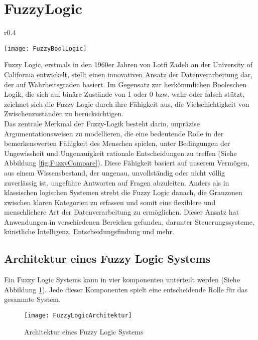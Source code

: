 \section{FuzzyLogic}
\begin{wrapfigure}{r}{0.4\textwidth}
    \vspace{-1.1cm}
    \begin{center}
      \texttt{[image: FuzzyBoolLogic]}
    \end{center}
    \vspace{-0.5cm}
    \caption{Vergleich von Fuzzy Logic zu Boolischer Logik \cite{FuzzyLogicTPoint}}
    \label{fig:FuzzyCompare}
    \vspace{-0.5cm}
  \end{wrapfigure}
Fuzzy Logic, erstmals in den 1960er Jahren von Lotfi Zadeh an der University of California entwickelt, stellt einen innovativen Ansatz der Datenverarbeitung dar, der auf Wahrheitsgraden basiert. Im Gegensatz zur herkömmlichen Booleschen Logik, die sich auf binäre Zustände von 1 oder 0 bzw. wahr oder falsch stützt, zeichnet sich die Fuzzy Logic durch ihre Fähigkeit aus, die Vielschichtigkeit von Zwischenzuständen zu berücksichtigen.\cite{FuzzyLogicTechTarget}\\
Das zentrale Merkmal der Fuzzy-Logik besteht darin, unpräzise Argumentationsweisen zu modellieren, die eine bedeutende Rolle in der bemerkenswerten Fähigkeit des Menschen spielen, unter Bedingungen der Ungewissheit und Ungenauigkeit rationale Entscheidungen zu treffen (Siehe Abbildung \ref{fig:FuzzyCompare}). Diese Fähigkeit basiert auf unserem Vermögen, aus einem Wissensbestand, der ungenau, unvollständig oder nicht völlig zuverlässig ist, ungefähre Antworten auf Fragen abzuleiten. Anders als in klassischen logischen Systemen strebt die Fuzzy Logic danach, die Grauzonen zwischen klaren Kategorien zu erfassen und somit eine flexiblere und menschlichere Art der Datenverarbeitung zu ermöglichen. Dieser Ansatz hat Anwendungen in verschiedenen Bereichen gefunden, darunter Steuerungssysteme, künstliche Intelligenz, Entscheidungsfindung und mehr. \cite{LoftiFuzzyLogic}

\subsection{Architektur eines Fuzzy Logic Systems}
Ein Fuzzy Logic Systems kann in vier komponenten unterteilt werden (Siehe Abbildung \ref{fig:FuzzyLogicArchitektur}). Jede dieser Komponenten spielt eine entscheidende Rolle für das gesammte System.  
\begin{center}
    \begin{figure}[h]
     \centering
     \texttt{[image: FuzzyLogicArchitektur]}
     \caption{Architektur eines Fuzzy Logic Systems \cite{FuzzyLogicTPoint}}
     \label{fig:FuzzyLogicArchitektur}
    \end{figure}
   \end{center}

